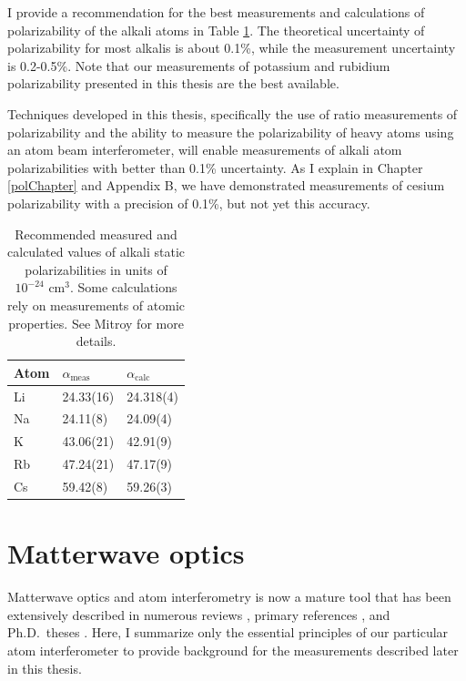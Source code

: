 I provide a recommendation for the best measurements and calculations of polarizability of the alkali atoms in Table \ref{polResultsRecValues}. The theoretical uncertainty of polarizability for most alkalis is about 0.1\%, while the measurement uncertainty is 0.2-0.5\%. Note that our measurements of potassium and rubidium polarizability presented in this thesis are the best available. 

Techniques developed in this thesis, specifically the use of ratio measurements of polarizability and the ability to measure the polarizability of heavy atoms using an atom beam interferometer, will enable measurements of alkali atom polarizabilities with better than 0.1\% uncertainty. As I explain in Chapter \ref{polChapter} and Appendix B, we have demonstrated measurements of cesium polarizability with a precision of 0.1\%, but not yet this accuracy. 


\begin{table}
\caption[Recommended measured and calculated values of alkali static polarizabilities.]{\label{polResultsRecValues}Recommended measured and calculated values of alkali static polarizabilities in units of $10^{-24}\textrm{ cm}^3$. Some calculations rely on measurements of atomic properties. See Mitroy \etal \cite{Mit10} for more details.}
\begin{center}
\begin{tabular}{l l l }
\hline\hline
Atom & $\alpha_\textrm{meas}$ & $\alpha_\textrm{calc}$ \\
\hline
Li & 24.33(16) \cite{Mif06} & 24.318(4) \cite{Tan10} \\
Na & 24.11(8) \, \cite{Eks95} & 24.09(4)\,\,\, \cite{Der99} \\
K & 43.06(21) \cite{Hol10} & 42.91(9) \, \cite{Aro07} \\
Rb & 47.24(21) \cite{Hol10} & 47.17(9) \, \cite{Aro12a} \\
Cs & 59.42(8) \, \cite{Ami03} & 59.26(3) \, \cite{Der99}  \\
\hline
\end{tabular}
\end{center}
\end{table}






\section{Matterwave optics}
\label{matterwaveOptics}
Matterwave optics and atom interferometry is now a mature tool that has been extensively described in numerous reviews \cite{Ram56,Ber97,Mif06a,Cro09,Hor12}, primary references \cite{Kei91,And97,Bre02,Wan05,Gar06,Hof06,Ger07,Chi11}, and Ph.D.~theses \cite{Kok01,Rob02,Per05Thesis,McM09,Lon11a}. Here, I summarize only the essential principles of our particular atom interferometer to provide background for the measurements described later in this thesis.



